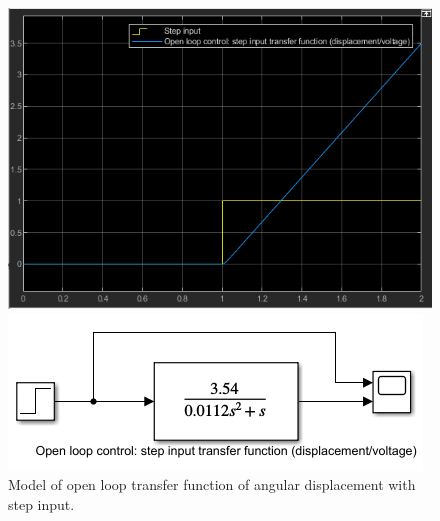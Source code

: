 \documentclass[conference]{IEEEtran}
\begin{document}
\begin{figure}[htbp]
    \centering
    \begin{minipage}[b]{0.24\textwidth}
        \includegraphics[width=\textwidth]{./Graph/G5.png}
        \caption{}
        \label{oltad2}
    \end{minipage}
    \hfill
    \begin{minipage}[b]{0.24\textwidth}
        \centering
        \includegraphics[width=\textwidth]{./Graph/G5'.png}
        \caption{Model of open loop transfer function of angular displacement with step input.}
    \end{minipage}
\end{figure}
\end{document}
